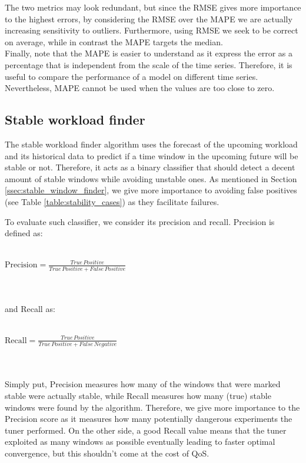 \documentclass[a4paper, 12pt]{article} %
\begin{document}
	The two metrics may look redundant, but since the RMSE gives more importance to the highest errors, by considering the RMSE over the MAPE we are actually increasing sensitivity to outliers. Furthermore, using RMSE we seek to be correct on average, while in contrast the MAPE targets the median.\\
	Finally, note that the MAPE is easier to understand as it express the error as a percentage that is independent from the scale of the time series. Therefore, it is useful to compare the performance of a model on different time series. Nevertheless, MAPE cannot be used when the values are too close to zero.
	
	\subsection{Stable workload finder } \label{ssec:exp_stable_wkld_finder}
	The stable workload finder algorithm uses the forecast of the upcoming workload and its historical data to predict if a time window in the upcoming future will be stable or not. Therefore, it acts as a binary classifier that should detect a decent amount of stable windows while avoiding unstable ones. As mentioned in Section \ref{ssec:stable_window_finder}, we give more importance to avoiding false positives (see Table \ref{table:stability_cases}) as they facilitate failures.
	
	To evaluate such classifier, we consider its precision and recall. Precision is defined as:\\\\
	\centerline{
	$
	\text{Precision} = \frac{ True \, Positive}{ True \, Positive + False \, Positive}
	$
	}\\\\
	and Recall as:\\\\
	\centerline{
		$
		\text{Recall} = \frac{ True \, Positive}{ True \, Positive + False \, Negative}
		$
	}\\\\
	Simply put, Precision measures how many of the windows that were marked stable were actually stable, while Recall measures how many (true) stable windows were found by the algorithm. Therefore, we give more importance to the Precision score as it measures how many potentially dangerous experiments the tuner performed. On the other side, a good Recall value means that the tuner exploited as many windows as possible eventually leading to faster optimal convergence, but this shouldn't come at the cost of QoS.
	
\end{document}
